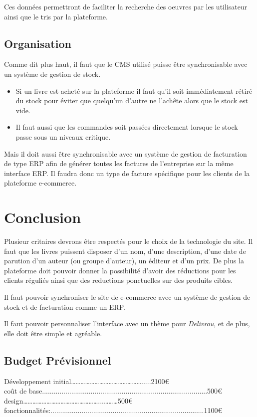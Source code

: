 \documentclass[a4paper,12pt]{report}
\begin{document}
Ces données permettront de faciliter la recherche des oeuvres par les utilisateur
ainsi que le tris par la plateforme.

\section{Organisation}
Comme dit plus haut, il faut que le CMS utilisé puisse être synchronisable avec
un système de gestion de stock.

\begin{itemize}
\item Si un livre est acheté sur la plateforme il faut qu'il soit immédiatement
  rétiré du stock pour éviter que quelqu'un d'autre ne l'achête alors que le
  stock est vide.
\item Il faut aussi que les commandes soit passées directement lorsque le stock
  passe sous un niveaux critique.
\end{itemize}
Mais il doit aussi être synchronisable avec un système de gestion de
facturation de type ERP afin de générer toutes les factures de l'entreprise sur
la même interface ERP. Il faudra donc un type de facture spécifique pour les
clients de la plateforme e-commerce.

\chapter{Conclusion}
Plusieur critaires devrons être respectés pour le choix de la technologie du
site.
Il faut que les livres puissent disposer d'un nom, d'une description, d'une
date de parution d'un auteur (ou groupe d'auteur), un éditeur et d'un prix.
De plus la plateforme doit pouvoir donner la possibilité d'avoir des
réductions pour les clients réguliés ainsi que des reductions ponctuelles sur
des produits cibles.

Il faut pouvoir synchroniser le site de e-commerce avec un système de gestion
de stock et de facturation comme un ERP.

Il faut pouvoir personnaliser l'interface avec un thème pour
\textit{Delivrou}, et de plus, elle doit être simple et agréable.

\newpage
\section{Budget Prévisionnel}
Développement initial……………………………………….....2100\euro  \\
\hangindent=1.5cm coût de base.....................................................................................500\euro  \\
design…………………………………………...………500\euro  \\
fonctionnalités:...............................................................................1100\euro  \\
\end{document}

